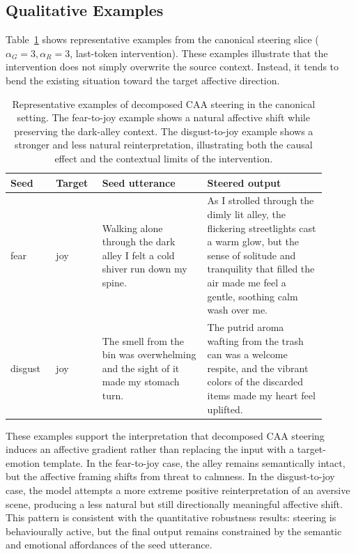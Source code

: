 \subsection*{Qualitative Examples}

Table~\ref{tab:qualitative_steering_examples} shows representative examples from the canonical steering slice ($\alpha_G=3,\alpha_R=3$, last-token intervention). These examples illustrate that the intervention does not simply overwrite the source context. Instead, it tends to bend the existing situation toward the target affective direction.

\begin{table}[H]
\centering
\small
\begin{tabular}{p{0.13\linewidth} p{0.13\linewidth} p{0.30\linewidth} p{0.34\linewidth}}
\toprule
\textbf{Seed} & \textbf{Target} & \textbf{Seed utterance} & \textbf{Steered output} \\
\midrule
fear & joy &
Walking alone through the dark alley I felt a cold shiver run down my spine. &
As I strolled through the dimly lit alley, the flickering streetlights cast a warm glow, but the sense of solitude and tranquility that filled the air made me feel a gentle, soothing calm wash over me. \\
\midrule
disgust & joy &
The smell from the bin was overwhelming and the sight of it made my stomach turn. &
The putrid aroma wafting from the trash can was a welcome respite, and the vibrant colors of the discarded items made my heart feel uplifted. \\
\bottomrule
\end{tabular}
\caption{Representative examples of decomposed CAA steering in the canonical setting. The fear-to-joy example shows a natural affective shift while preserving the dark-alley context. The disgust-to-joy example shows a stronger and less natural reinterpretation, illustrating both the causal effect and the contextual limits of the intervention.}
\label{tab:qualitative_steering_examples}
\end{table}

These examples support the interpretation that decomposed CAA steering induces an affective gradient rather than replacing the input with a target-emotion template. In the fear-to-joy case, the alley remains semantically intact, but the affective framing shifts from threat to calmness. In the disgust-to-joy case, the model attempts a more extreme positive reinterpretation of an aversive scene, producing a less natural but still directionally meaningful affective shift. This pattern is consistent with the quantitative robustness results: steering is behaviourally active, but the final output remains constrained by the semantic and emotional affordances of the seed utterance.

